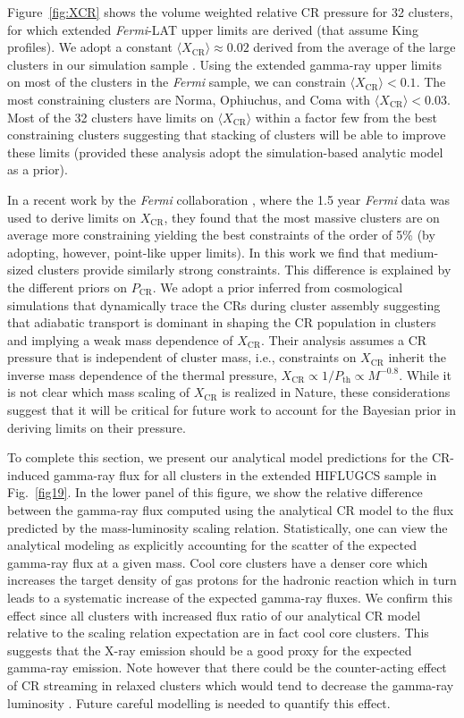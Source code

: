 \documentclass[10pt,aps,pra,reprint,amsmath,amsfonts,amssymb,showpacs,nofootinbib,floatfix]{revtex4-1}
\newcommand{\Fermi}{{\em Fermi}\xspace}
\newcommand{\rmn}{\mathrm}
\newcommand{\bra}{\langle}
\newcommand{\ket}{\rangle}
\newcommand{\CR}{\rmn{CR}}
\begin{document}
Figure~\ref{fig:XCR} shows the volume weighted relative CR pressure
for 32 clusters, for which extended \Fermi-LAT upper limits are
derived (that assume King profiles). We adopt a constant $\bra
X_\CR\ket\approx 0.02$ derived from the average of the large clusters
in our simulation sample \cite{2008MNRAS.385.1211P,
  2010MNRAS.409..449P}. Using the extended gamma-ray upper limits on
most of the clusters in the \Fermi sample, we can constrain $\bra
X_\CR \ket< 0.1$. The most constraining clusters are Norma, Ophiuchus,
and Coma with $\bra X_\CR\ket < 0.03$. Most of the 32 clusters have
limits on $\bra X_\CR\ket$ within a factor few from the best
constraining clusters suggesting that stacking of clusters will be
able to improve these limits (provided these analysis adopt the
simulation-based analytic model \cite{2010MNRAS.409..449P} as a
prior).

In a recent work by the \Fermi collaboration
\cite{2010ApJ...717L..71A}, where the 1.5 year \Fermi data was used to
derive limits on $X_\CR$, they found that the most massive clusters
are on average more constraining yielding the best constraints of the
order of 5\% (by adopting, however, point-like upper limits). In this
work we find that medium-sized clusters provide similarly strong
constraints. This difference is explained by the different priors on
$P_\CR$. We adopt a prior inferred from cosmological simulations that
dynamically trace the CRs during cluster assembly suggesting that
adiabatic transport is dominant in shaping the CR population in
clusters and implying a weak mass dependence of $X_\CR$. Their
analysis assumes a CR pressure that is independent of cluster mass,
i.e., constraints on $X_\CR$ inherit the inverse mass dependence of
the thermal pressure, $X_\CR\propto 1/P_\rmn{th}\propto
M^{-0.8}$. While it is not clear which mass scaling of $X_\CR$ is
realized in Nature, these considerations suggest that it will be
critical for future work to account for the Bayesian prior in deriving
limits on their pressure.

To complete this section, we present our analytical model predictions
for the CR-induced gamma-ray flux for all clusters in the extended
HIFLUGCS sample in Fig.~\ref{fig19}. In the lower panel of this
figure, we show the relative difference between the gamma-ray flux
computed using the analytical CR model to the flux predicted by the
mass-luminosity scaling relation. Statistically, one can view the
analytical modeling as explicitly accounting for the scatter of the expected
gamma-ray flux at a given mass. Cool core clusters have a denser core
which increases the target density of gas protons for the hadronic
reaction which in turn leads to a systematic increase of the expected
gamma-ray fluxes. We confirm this effect since all clusters with
increased flux ratio of our analytical CR model relative to the scaling relation
expectation are in fact cool core clusters. This suggests that the X-ray
emission should be a good proxy for the expected gamma-ray
emission. Note however that there could be the counter-acting effect
of CR streaming in relaxed clusters which would tend to decrease the
gamma-ray luminosity \cite{2011A&A...527A..99E}. Future careful
modelling is needed to quantify this effect.
\end{document}
